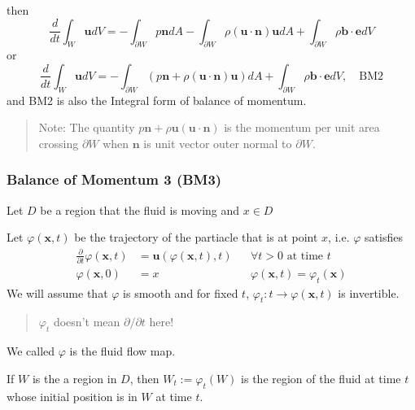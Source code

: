 then 
\begin{equation}
\frac{d}{dt} \int_{W} \textbf{u} dV = -\int_{\partial W} p\textbf{n}dA
- \int_{\partial W} \rho(\textbf{u}\cdot\textbf{n}) \textbf{u}dA + \int_{\partial W} \rho \textbf{b}\cdot \textbf{e} dV
\end{equation}
or 
\begin{equation}
\frac{d}{dt} \int_{W} \textbf{u} dV = -\int_{\partial W} \left(p\textbf{n} + \rho(\textbf{u}\cdot\textbf{n}) \textbf{u}\right)dA + \int_{\partial W} \rho \textbf{b}\cdot \textbf{e} dV,\quad \text{BM2}
\end{equation}
and BM2 is also the Integral form of balance of momentum.

\begin{quote}
	Note: The quantity $p\textbf{n} + \rho \textbf{u}(\textbf{u}\cdot \textbf{n})$ is the momentum per unit area crossing $\partial W$ when $\textbf{n}$ is unit vector outer normal to $\partial W$.
\end{quote}

\subsubsection{Balance of Momentum 3 (BM3)} %

Let $D$ be a region that the fluid is moving and $x\in D$

Let $\varphi (\textbf{x},t)$ be the trajectory of the partiacle that is at point $x$, i.e. $\varphi$ satisfies 
\begin{equation}
\begin{aligned}
\frac{\partial}{\partial t}\varphi(\textbf{x},t) &= \textbf{u} \left(\varphi(\textbf{x},t),t\right)
&&\text{$\forall t > 0$ at time $t$}
\\
\varphi(\textbf{x},0) &= x && \varphi(\textbf{x},t) = \varphi_t(\textbf{x})
\end{aligned}
\end{equation}
We will assume that $\varphi$ is smooth and for fixed $t$, $\varphi_t:t\to\varphi(\textbf{x},t)$ is invertible.

\begin{quote}
	$\varphi_t$ doesn't mean $\partial/\partial t$ here!
\end{quote}

We called $\varphi$ is the fluid flow map.



If $W$ is the a region in $D$, then $W_t := \varphi_{t}(W)$ is the region of the fluid at time $t$ whose initial position is in $W$ at time $t$.

